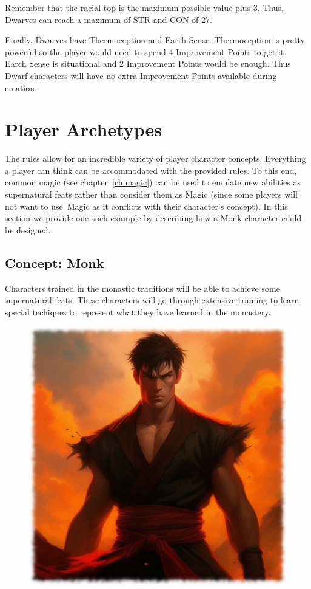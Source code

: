 Remember that the racial top is the maximum possible value plus 3. Thus, Dwarves can reach a maximum of STR and CON of 27.

Finally, Dwarves have Thermoception and Earth Sense. Thermoception is pretty powerful so the player would need to spend 4 Improvement Points to get it. Earch Sense is situational and 2 Improvement Points would be enough. Thus Dwarf characters will have no extra Improvement Points available during creation.



\section{Player Archetypes}

The rules allow for an incredible variety of player character concepts. Everything a player can think can be accommodated with the provided rules. To this end, common magic (see chapter~\ref{ch:magic}) can be used to emulate new abilities as supernatural feats rather than consider them as Magic (since some players will not want to use Magic as it conflicts with their character's concept). In this section we provide one such example by describing how a Monk character could be designed.

\subsection{Concept: Monk}
Characters trained in the monastic traditions will be able to achieve some supernatural feats. These characters will go through extensive training to learn special techiques to represent what they have learned in the monastery.

\begin{figure}[H]
\begin{center}
\includegraphics[scale=0.23]{img/ai-images/monk.png}
\end{center}
\end{figure}

